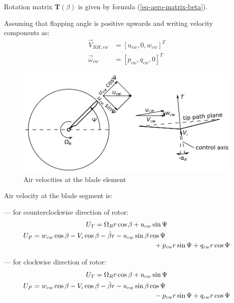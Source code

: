 Rotation matrix ${\boldsymbol T} \left( \beta \right)$ is given by formula (\ref{eq-aero-matrix-beta}).

Assuming that flapping angle is positive upwards and writing velocity components as:
\begin{align}
  {\vec V}_{RH,cw} &= \left[ u_{cw}, 0, w_{cw} \right]^T \\
  {\vec \omega}_{cw} &= \left[ p_{cw}, q_{cw}, 0 \right]^T
\end{align}

\begin{figure}
  \centering
  \includegraphics[width=120mm]{images/blade_element_velocity.eps}
  \caption{Air velocities at the blade element}
\end{figure}

Air velocity at the blade segment is:

--- for counterclockwise direction of rotor:
\begin{gather}
  U_T = \Omega_R r \cos \beta + u_{cw} \sin \Psi \\
  \begin{multlined}[0.88\textwidth]
    U_P =
    w_{cw} \cos \beta - V_i \cos \beta
    - \dot \beta r - u_{cw} \sin \beta \cos \Psi \\
    + p_{cw} r \sin \Psi + q_{cw} r \cos \Psi
  \end{multlined}
\end{gather}

--- for clockwise direction of rotor:
\begin{gather}
  U_T = \Omega_R r \cos \beta + u_{cw} \sin \Psi \\
  \begin{multlined}[0.88\textwidth]
    U_P =
    w_{cw} \cos \beta - V_i \cos \beta
    - \dot \beta r - u_{cw} \sin \beta \cos \Psi \\
    - p_{cw} r \sin \Psi + q_{cw} r \cos \Psi
  \end{multlined}
\end{gather}


